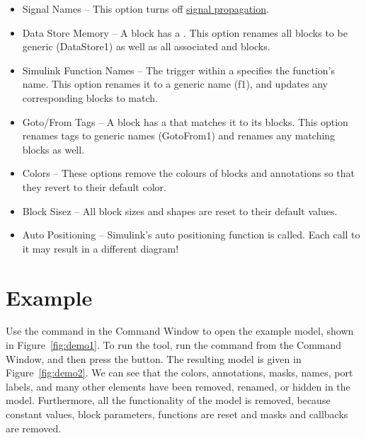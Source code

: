 \documentclass{article}
\makeatletter
\newcommand{\demoName}{\cmd{sldemo\_auto\_climatecontrol}\@\xspace}
\makeatother
\begin{document}
\begin{itemize}
	\item Signal Names – This option turns off \href{https://www.mathworks.com/help/simulink/ug/signal-label-propagation.html}{signal propagation}.

	\item Data Store Memory -- A \DSM block has a . This option renames all  \DSM blocks to be generic (\eg DataStore1) as well as all associated \DSR and \DSW blocks.

	\item Simulink Function Names -- The trigger within a \simfunc specifies the function's name. This option renames it to a generic name (\eg f1), and updates any corresponding \simfunccaller blocks to match.
	
	\item Goto/From Tags -- A \goto block has a  that matches it to its \from blocks. This option renames tags to generic names (\eg GotoFrom1) and renames any matching \from blocks as well.
	
	\item Colors -- These options remove the colours of blocks and annotations so that they revert to their default color.

	\item Block Sisez -- All block sizes and shapes are reset to their default values.

	\item Auto Positioning -- Simulink's auto positioning function is called. Each call to it may result in a different diagram!
\end{itemize}



\section{Example}

Use the command \demoName in the \Simulink Command Window to open the example model, shown in Figure~\ref{fig:demo1}. To run the tool, run the command  from the Command Window, and then press the  button. The resulting model is given in Figure~\ref{fig:demo2}. We can see that the colors, annotations, masks, names, port labels, and many other elements have been removed, renamed, or hidden in the model. Furthermore, all the functionality of the model is removed, because constant values, block parameters, functions are reset and masks and callbacks are removed.
\end{document}
